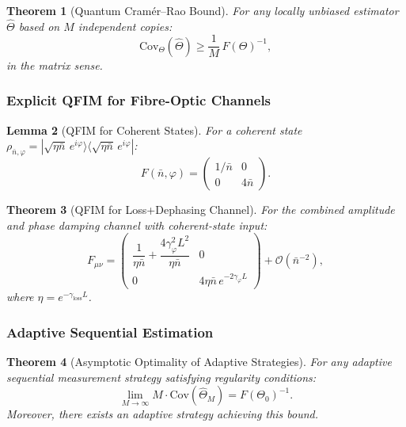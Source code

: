 \documentclass[journal,twocolumn]{IEEEtran}
\theoremstyle{definition}
\theoremstyle{plain}
\newtheorem{theorem}{Theorem}[section]
\newtheorem{lemma}[theorem]{Lemma}
\begin{document}
\begin{theorem}[Quantum Cram\'{e}r--Rao Bound]
For any locally unbiased estimator $\hat\Theta$ based on $M$ independent
copies:
\begin{equation}
  \mathrm{Cov}_\Theta(\hat\Theta)\ge\frac{1}{M}\,F(\Theta)^{-1},
  \label{eq:QCRB}
\end{equation}
in the matrix sense.
\end{theorem}

\subsubsection{Explicit QFIM for Fibre-Optic Channels}

\begin{lemma}[QFIM for Coherent States]
For a coherent state
$\rho_{\bar{n},\varphi}=|\sqrt{\eta\bar{n}}\,e^{i\varphi}\rangle
\langle\sqrt{\eta\bar{n}}\,e^{i\varphi}|$:
\begin{equation}
  F(\bar{n},\varphi)=\begin{pmatrix}1/\bar{n}&0\\0&4\bar{n}\end{pmatrix}.
\end{equation}
\end{lemma}

\begin{theorem}[QFIM for Loss+Dephasing Channel]
For the combined amplitude and phase damping channel with coherent-state
input:
\begin{equation}
  F_{\mu\nu}=
  \begin{pmatrix}
    \dfrac{1}{\eta\bar{n}}+\dfrac{4\gamma_\varphi^2 L^2}{\eta\bar{n}}
    & 0\\[8pt]
    0 & 4\eta\bar{n}\,e^{-2\gamma_\varphi L}
  \end{pmatrix}+\mathcal{O}(\bar{n}^{-2}),
\end{equation}
where $\eta=e^{-\gamma_{\mathrm{loss}}L}$.
\end{theorem}

\subsubsection{Adaptive Sequential Estimation}

\begin{theorem}[Asymptotic Optimality of Adaptive Strategies]
For any adaptive sequential measurement strategy satisfying regularity
conditions:
\begin{equation}
  \lim_{M\to\infty}M\cdot\mathrm{Cov}(\hat\Theta_M)=F(\Theta_0)^{-1}.
\end{equation}
Moreover, there exists an adaptive strategy achieving this bound.
\end{theorem}
\end{document}
